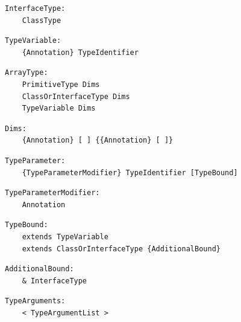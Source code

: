 \noindent\textbf{\texttt{}}\par
\begin{lstlisting}
InterfaceType:
    ClassType
\end{lstlisting}

\noindent\textbf{\texttt{}}\par
\begin{lstlisting}
TypeVariable:
    {Annotation} TypeIdentifier
\end{lstlisting}

\noindent\textbf{\texttt{}}\par
\begin{lstlisting}
ArrayType:
    PrimitiveType Dims
    ClassOrInterfaceType Dims
    TypeVariable Dims
\end{lstlisting}

\noindent\textbf{\texttt{}}\par
\begin{lstlisting}
Dims:
    {Annotation} [ ] {{Annotation} [ ]}
\end{lstlisting}

\noindent\textbf{\texttt{}}\par
\begin{lstlisting}
TypeParameter:
    {TypeParameterModifier} TypeIdentifier [TypeBound]
\end{lstlisting}

\noindent\textbf{\texttt{}}\par
\begin{lstlisting}
TypeParameterModifier:
    Annotation
\end{lstlisting}

\noindent\textbf{\texttt{}}\par
\begin{lstlisting}
TypeBound:
    extends TypeVariable
    extends ClassOrInterfaceType {AdditionalBound}
\end{lstlisting}

\noindent\textbf{\texttt{}}\par
\begin{lstlisting}
AdditionalBound:
    & InterfaceType
\end{lstlisting}

\noindent\textbf{\texttt{}}\par
\begin{lstlisting}
TypeArguments:
    < TypeArgumentList >
\end{lstlisting}


